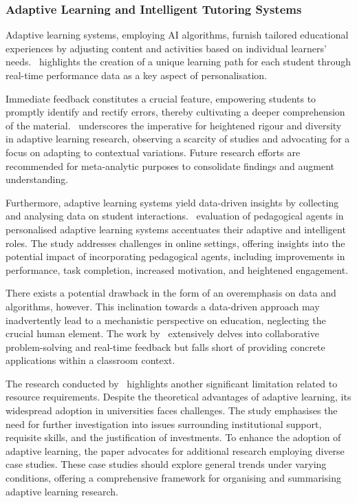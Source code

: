 \subsubsection{Adaptive Learning and Intelligent Tutoring Systems} Adaptive learning systems, employing AI algorithms, furnish tailored educational experiences by adjusting content and activities based on individual learners' needs.~\citet{ElSabagh2021} highlights the creation of a unique learning path for each student through real-time performance data as a key aspect of personalisation. 

Immediate feedback constitutes a crucial feature, empowering students to promptly identify and rectify errors, thereby cultivating a deeper comprehension of the material.~\citet{munoz2022systematic} underscores the imperative for heightened rigour and diversity in adaptive learning research, observing a scarcity of studies and advocating for a focus on adapting to contextual variations. Future research efforts are recommended for meta-analytic purposes to consolidate findings and augment understanding.

Furthermore, adaptive learning systems yield data-driven insights by collecting and analysing data on student interactions.~\citet{Apoki2022} evaluation of pedagogical agents in personalised adaptive learning systems accentuates their adaptive and intelligent roles. The study addresses challenges in online settings, offering insights into the potential impact of incorporating pedagogical agents, including improvements in performance, task completion, increased motivation, and heightened engagement.

There exists a potential drawback in the form of an overemphasis on data and algorithms, however. This inclination towards a data-driven approach may inadvertently lead to a mechanistic perspective on education, neglecting the crucial human element. The work by~\citet{Rojas2022} extensively delves into collaborative problem-solving and real-time feedback but falls short of providing concrete applications within a classroom context.

The research conducted by~\citet{Mirata2020} highlights another significant limitation related to resource requirements. Despite the theoretical advantages of adaptive learning, its widespread adoption in universities faces challenges. The study emphasises the need for further investigation into issues surrounding institutional support, requisite skills, and the justification of investments. To enhance the adoption of adaptive learning, the paper advocates for additional research employing diverse case studies. These case studies should explore general trends under varying conditions, offering a comprehensive framework for organising and summarising adaptive learning research.

